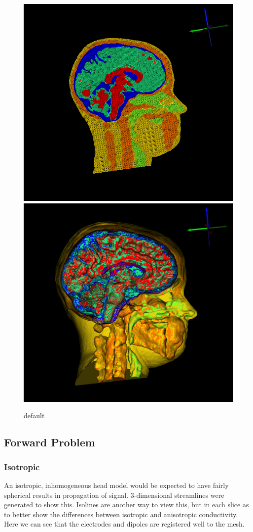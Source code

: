 \begin{figure}[H]
\begin{center}
\includegraphics[width=.49\textwidth]{Figures/smallmesh_2}
\includegraphics[width=.49\textwidth]{Figures/smallmesh_surface}
\caption{default}
\label{default}
\end{center}
\end{figure}

\subsection{Forward Problem}

\subsubsection{Isotropic}

An isotropic, inhomogeneous head model would be expected to have fairly spherical results in propagation of signal. 3-dimensional streamlines were generated to show this. Isolines are another way to view this, but in each slice as to better show the differences between isotropic and anisotropic conductivity. Here we can see that the electrodes and dipoles are registered well to the mesh. 

